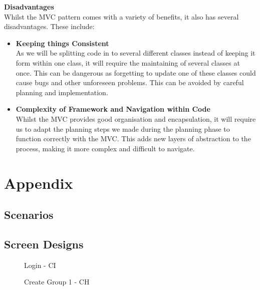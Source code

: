 \documentclass[a4paper]{article}
\begin{document}
\textbf{Disadvantages} \\
Whilst the MVC pattern comes with a variety of benefits, it also has several disadvantages. These include:
\begin{itemize}
    \item \textbf{Keeping things Consistent} \\
    As we will be splitting code in to several different classes instead of keeping it form within one class, it will require the maintaining of several classes at once. This can be dangerous as forgetting to update one of these classes could cause bugs and other unforeseen problems. This can be avoided by careful planning and implementation. \\
    \item \textbf{Complexity of Framework and Navigation within Code} \\
    Whilst the MVC provides good organisation and encapsulation, it will require us to adapt the planning steps we made during the planning phase to function correctly with the MVC. This adds new layers of abstraction to the process, making it more complex and difficult to navigate.
\end{itemize}

\section{Appendix}
\subsection{Scenarios}






\clearpage
\subsection{Screen Designs}
\begin{figure}[!ht]
    \centering{} %
    \caption{Login - CI}
    \label{fig:login}
\end{figure}

\begin{figure}[!ht] 
    \centering{} %
    \caption{Create Group 1 - CH}
    \label{fig:create_group1}
\end{figure}
\end{document}
